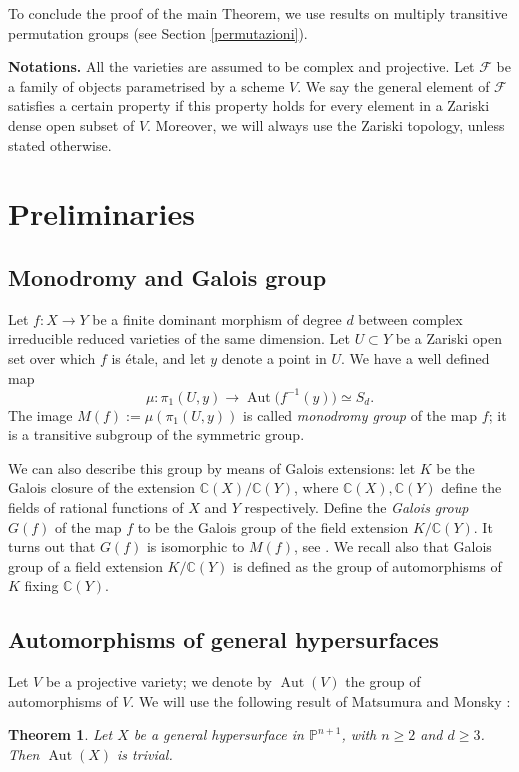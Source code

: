 \documentclass[12pt,a4paper,twoside,leqno,noamsfonts]{amsart}
\newtheorem{thm}[cor]{Theorem}
\theoremstyle{definition}
\newcommand{\bC}{\mathbb{C}}
\newcommand{\bP}{\mathbb{P}}
\newcommand{\sF}{\mathscr{F}}
\newcommand{\aut}{\operatorname{Aut}}
\begin{document}
To conclude the proof of the main Theorem, we use results on multiply transitive permutation groups (see Section \ref{permutazioni}). 

 \medskip



\textbf{Notations.}
All the varieties are assumed to be complex and projective. Let $\sF$ be a family of objects parametrised by a scheme $V$. We say the general element of $\sF$ satisfies a certain property if this property holds for every element in a Zariski dense open subset of $V$. Moreover, we will always use the Zariski topology, unless stated otherwise. 

\section{Preliminaries} \label{sec:preliminaries}
\subsection{Monodromy and Galois group}
Let $f:X \to Y$ be a finite dominant morphism of degree $d$ between complex irreducible reduced varieties of the same dimension. Let $U \subset Y$ be a Zariski open set over which $f$ is \'etale, and let $y$ denote a point in $U$. We have a well defined map
$$\mu: \pi_1(U,y) \to \aut\big(f^{-1}(y)\big) \simeq S_d.$$
The image $M(f):=\mu\left(\pi_1(U,y)\right)$ is called \emph{monodromy group} of the map $f$; it is a transitive subgroup of the symmetric group.

We can also describe this group by means of Galois extensions: let $K$ be the Galois closure of the extension $\bC(X)/\bC(Y)$, where $\bC(X),\bC(Y)$ define the fields of rational functions of $X$ and $Y$ respectively. Define the \emph{Galois group} $G(f)$ of the map $f$ to be the Galois group of the field extension $K/\bC(Y)$.
It turns out that $G(f)$ is isomorphic to $M(f)$, see \cite[Section I]{H}. We recall also that Galois group of a field extension $K/\bC(Y)$ is defined as the group of automorphisms of $K$ fixing $\bC(Y)$. 

\subsection{Automorphisms of general hypersurfaces}
Let $V$ be a projective variety; we denote by $\aut(V)$ the group of automorphisms of $V$. We will use the following result of Matsumura and Monsky \cite{MM}:
\begin{thm}\label{autom}
Let $X$ be a general hypersurface in $\bP^{n+1}$, with $ n\geq 2$ and $d\geq 3$. Then $\operatorname{Aut}(X)$ is trivial.
\end{thm}
\end{document}
